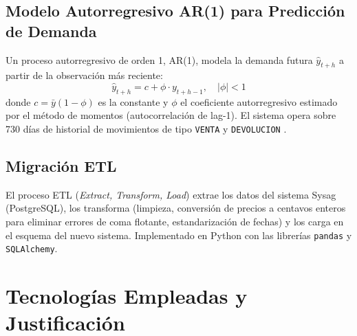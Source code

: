 \documentclass[12pt,a4paper,oneside]{report}
\begin{document}
\subsection{Modelo Autorregresivo AR(1) para Predicción de Demanda}

Un proceso autorregresivo de orden 1, AR(1), modela la demanda futura $\hat{y}_{t+h}$ a partir de la observación más reciente:
\[
  \hat{y}_{t+h} = c + \phi \cdot y_{t+h-1}, \quad |\phi| < 1
\]
donde $c = \bar{y}(1 - \phi)$ es la constante y $\phi$ el coeficiente autorregresivo estimado por el método de momentos (autocorrelación de lag-1). El sistema opera sobre 730 días de historial de movimientos de tipo \texttt{VENTA} y \texttt{DEVOLUCION} \cite{box2015}.

\subsection{Migración ETL}

El proceso ETL (\textit{Extract, Transform, Load}) extrae los datos del sistema Sysag (PostgreSQL), los transforma (limpieza, conversión de precios a centavos enteros para eliminar errores de coma flotante, estandarización de fechas) y los carga en el esquema del nuevo sistema. Implementado en Python con las librerías \texttt{pandas} y \texttt{SQLAlchemy}.

\section{Tecnologías Empleadas y Justificación}
\end{document}
